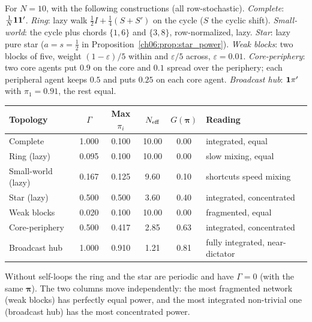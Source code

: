 \documentclass[../structural_economics_book.tex]{subfiles}
\begin{document}
\begin{example}\label{ch06:ex:gap}
For $N = 10$, with the following constructions (all row-stochastic). \textit{Complete}: $\frac1N\mathbf{1}\mathbf{1}'$. \textit{Ring}: lazy walk $\frac12 I + \frac14(S + S')$ on the cycle ($S$ the cyclic shift). \textit{Small-world}: the cycle plus chords $\{1,6\}$ and $\{3,8\}$, row-normalized, lazy. \textit{Star}: lazy pure star ($a = s = \frac12$ in Proposition~\ref{ch06:prop:star_power}). \textit{Weak blocks}: two blocks of five, weight $(1-\varepsilon)/5$ within and $\varepsilon/5$ across, $\varepsilon = 0.01$. \textit{Core-periphery}: two core agents put $0.9$ on the core and $0.1$ spread over the periphery; each peripheral agent keeps $0.5$ and puts $0.25$ on each core agent. \textit{Broadcast hub}: $\mathbf{1}\pi'$ with $\pi_1 = 0.91$, the rest equal.

\begin{center}
\begin{tabular}{lccccl}
\toprule
Topology & $\Gamma$ & Max $\pi_i$ & $N_{\text{eff}}$ & $G(\boldsymbol{\pi})$ & Reading \\
\midrule
Complete & 1.000 & 0.100 & 10.00 & 0.00 & integrated, equal \\
Ring (lazy) & 0.095 & 0.100 & 10.00 & 0.00 & slow mixing, equal \\
Small-world (lazy) & 0.167 & 0.125 & 9.60 & 0.10 & shortcuts speed mixing \\
Star (lazy) & 0.500 & 0.500 & 3.60 & 0.40 & integrated, concentrated \\
Weak blocks & 0.020 & 0.100 & 10.00 & 0.00 & fragmented, equal \\
Core-periphery & 0.500 & 0.417 & 2.85 & 0.63 & integrated, concentrated \\
Broadcast hub & 1.000 & 0.910 & 1.21 & 0.81 & fully integrated, near-dictator \\
\bottomrule
\end{tabular}
\end{center}

Without self-loops the ring and the star are periodic and have $\Gamma = 0$ (with the same $\boldsymbol{\pi}$). The two columns move independently: the most fragmented network (weak blocks) has perfectly equal power, and the most integrated non-trivial one (broadcast hub) has the most concentrated power.
\end{example}
\end{document}

